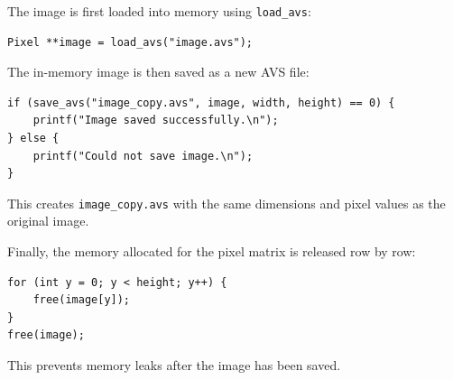 The image is first loaded into memory using \texttt{load\_avs}:

\begin{lstlisting}
Pixel **image = load_avs("image.avs");
\end{lstlisting}

The in-memory image is then saved as a new AVS file:

\begin{lstlisting}
if (save_avs("image_copy.avs", image, width, height) == 0) {
    printf("Image saved successfully.\n");
} else {
    printf("Could not save image.\n");
}
\end{lstlisting}

This creates \texttt{image\_copy.avs} with the same dimensions and pixel values
as the original image.

Finally, the memory allocated for the pixel matrix is released row by row:

\begin{lstlisting}
for (int y = 0; y < height; y++) {
    free(image[y]);
}
free(image);
\end{lstlisting}

This prevents memory leaks after the image has been saved.